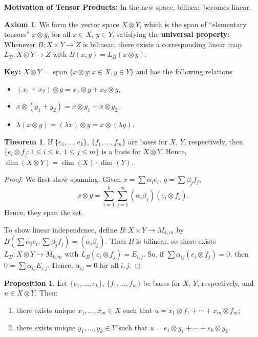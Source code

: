 \documentclass[12pt]{article}
\theoremstyle{definition}
\newtheorem*{theorem}{Theorem}
\newtheorem*{proposition}{Proposition}
\newtheorem*{axiom}{Axiom}
\begin{document}
\textbf{Motivation of Tensor Products:} In the new space, bilinear becomes linear.

\begin{axiom}
We form the vector space $X \otimes Y$, which is the span of ``elementary tensors'' $x \otimes y$, for all $x \in X$, $y \in Y$, satisfying the \textbf{universal property}: Whenever $B : X \times Y \to Z$ is bilinear, there exists a corresponding linear map $L_B : X \otimes Y \to Z$ with $B(x,y) = L_B(x \otimes y)$.
\end{axiom}

\textbf{Key:} $X \otimes Y = \operatorname{span}\{x \otimes y : x \in X, y \in Y\}$ and has the following relations:
\begin{itemize}
\item $(x_1+x_2) \otimes y = x_1 \otimes y + x_2 \otimes y$,
\item $x \otimes (y_1+y_2) = x \otimes y_1 + x \otimes y_2$,
\item $\lambda(x \otimes y) = (\lambda x) \otimes y = x \otimes (\lambda y)$.
\end{itemize}

\begin{theorem}
If $\{e_1,\ldots,e_k\}$, $\{f_1,\ldots,f_m\}$ are bases for $X$, $Y$, respectively, then $\{e_i \otimes f_j : 1 \leq i \leq k,\, 1 \leq j \leq m\}$ is a basis for $X \otimes Y$. Hence, $\dim(X \otimes Y) = \dim(X) \cdot \dim(Y)$.
\end{theorem}

\begin{proof}
We first show spanning. Given $x = \sum \alpha_i e_i$, $y = \sum \beta_j f_j$,
\[
x \otimes y = \sum_{i=1}^k \sum_{j=1}^m (\alpha_i \beta_j)(e_i \otimes f_j).
\]
Hence, they span the set.

To show linear independence, define $B : X \times Y \to M_{k,m}$ by $B(\sum \alpha_i e_i, \sum \beta_j f_j) = (\alpha_i \beta_j)$. Then $B$ is bilinear, so there exists $L_B : X \otimes Y \to M_{k,m}$ with $L_B(e_i \otimes f_j) = E_{i,j}$. So, if $\sum \alpha_{ij}(e_i \otimes f_j) = 0$, then $0 = \sum \alpha_{ij} E_{i,j}$. Hence, $\alpha_{ij} = 0$ for all $i,j$.
\end{proof}

\begin{proposition}
Let $\{e_1,\ldots,e_k\}$, $\{f_1,\ldots,f_m\}$ be bases for $X$, $Y$, respectively, and $u \in X \otimes Y$. Then:
\begin{enumerate}
\item there exists unique $x_1,\ldots,x_m \in X$ such that $u = x_1 \otimes f_1 + \cdots + x_m \otimes f_m$;
\item there exists unique $y_1,\ldots,y_k \in Y$ such that $u = e_1 \otimes y_1 + \cdots + e_k \otimes y_k$.
\end{enumerate}
\end{proposition}
\end{document}
